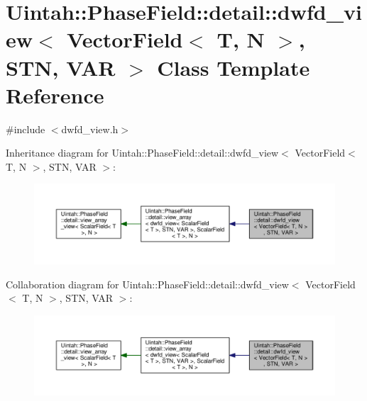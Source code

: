 \hypertarget{classUintah_1_1PhaseField_1_1detail_1_1dwfd__view_3_01VectorField_3_01T_00_01N_01_4_00_01STN_00_01VAR_01_4}{}\section{Uintah\+:\+:Phase\+Field\+:\+:detail\+:\+:dwfd\+\_\+view$<$ Vector\+Field$<$ T, N $>$, S\+TN, V\+AR $>$ Class Template Reference}
\label{classUintah_1_1PhaseField_1_1detail_1_1dwfd__view_3_01VectorField_3_01T_00_01N_01_4_00_01STN_00_01VAR_01_4}


{\ttfamily \#include $<$dwfd\+\_\+view.\+h$>$}



Inheritance diagram for Uintah\+:\+:Phase\+Field\+:\+:detail\+:\+:dwfd\+\_\+view$<$ Vector\+Field$<$ T, N $>$, S\+TN, V\+AR $>$\+:\nopagebreak
\begin{figure}[H]
\begin{center}
\leavevmode
\includegraphics[width=350pt]{classUintah_1_1PhaseField_1_1detail_1_1dwfd__view_3_01VectorField_3_01T_00_01N_01_4_00_01STN_00_01VAR_01_4__inherit__graph}
\end{center}
\end{figure}


Collaboration diagram for Uintah\+:\+:Phase\+Field\+:\+:detail\+:\+:dwfd\+\_\+view$<$ Vector\+Field$<$ T, N $>$, S\+TN, V\+AR $>$\+:\nopagebreak
\begin{figure}[H]
\begin{center}
\leavevmode
\includegraphics[width=350pt]{classUintah_1_1PhaseField_1_1detail_1_1dwfd__view_3_01VectorField_3_01T_00_01N_01_4_00_01STN_00_01VAR_01_4__coll__graph}
\end{center}
\end{figure}

